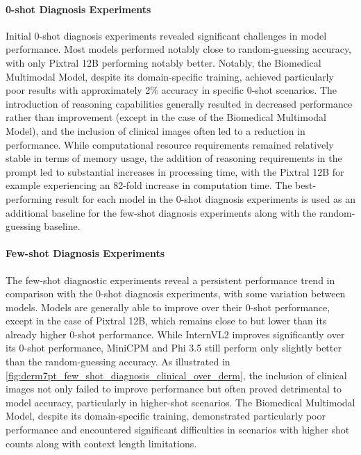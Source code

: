 \documentclass[../ShajiS_RnDReport.tex]{subfiles}
\begin{document}
\paragraph{0-shot Diagnosis Experiments}
Initial 0-shot diagnosis experiments revealed significant challenges in model performance. Most models performed notably close to random-guessing accuracy, with only Pixtral 12B performing notably better. Notably, the Biomedical Multimodal Model, despite its domain-specific training, achieved particularly poor results with approximately 2\% accuracy in specific 0-shot scenarios. The introduction of reasoning capabilities generally resulted in decreased performance rather than improvement (except in the case of the Biomedical Multimodal Model), and the inclusion of clinical images often led to a reduction in performance. While computational resource requirements remained relatively stable in terms of memory usage, the addition of reasoning requirements in the prompt led to substantial increases in processing time, with the Pixtral 12B for example experiencing an 82-fold increase in computation time. The best-performing result for each model in the 0-shot diagnosis experiments is used as an additional baseline for the few-shot diagnosis experiments along with the random-guessing baseline.

\paragraph{Few-shot Diagnosis Experiments}
The few-shot diagnostic experiments reveal a persistent performance trend in comparison with the 0-shot diagnosis experiments, with some variation between models. Models are generally able to improve over their 0-shot performance, except in the case of Pixtral 12B, which remains close to but lower than its already higher 0-shot performance. While InternVL2 improves significantly over its 0-shot performance, MiniCPM and Phi 3.5 still perform only slightly better than the random-guessing accuracy. As illustrated in \autoref{fig:derm7pt_few_shot_diagnosis_clinical_over_derm}, the inclusion of clinical images not only failed to improve performance but often proved detrimental to model accuracy, particularly in higher-shot scenarios. The Biomedical Multimodal Model, despite its domain-specific training, demonstrated particularly poor performance and encountered significant difficulties in scenarios with higher shot counts along with context length limitations.
\end{document}
